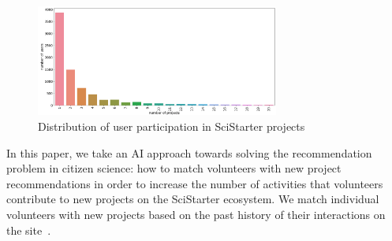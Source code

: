 \documentclass[letterpaper]{article} %
\begin{document}



\begin{figure}[t]
\centering
\includegraphics[width=8cm]{Figs/participation histogram.png}
\caption{Distribution of user participation in SciStarter projects
}
\label{fig:pinp}
\end{figure}







 In this paper, we take an AI approach towards solving the
 recommendation problem in citizen science: how to match volunteers
 with new project recommendations in order to increase the
 number of activities that volunteers contribute to new projects on
 the SciStarter ecosystem.
  We match individual volunteers with new projects based on the  past history of their interactions on the site~\cite{dwivedi2017recommender,amatriain2013big}.
\end{document}
